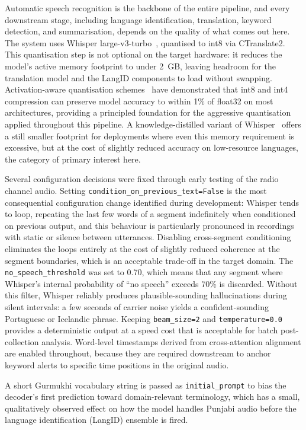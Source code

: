 \documentclass[conference]{IEEEtran}
\begin{document}
Automatic speech recognition is the backbone of the entire pipeline, and every downstream stage, including language identification, translation, keyword detection, and summarisation, depends on the quality of what comes out here. The system uses Whisper large-v3-turbo~\cite{radford2022whisper}, quantised to int8 via CTranslate2. This quantisation step is not optional on the target hardware: it reduces the model's active memory footprint to under 2~GB, leaving headroom for the translation model and the LangID components to load without swapping. Activation-aware quantisation schemes~\cite{lin2024awq} have demonstrated that int8 and int4 compression can preserve model accuracy to within 1\% of float32 on most architectures, providing a principled foundation for the aggressive quantisation applied throughout this pipeline. A knowledge-distilled variant of Whisper~\cite{gandhi2023distilwhisper} offers a still smaller footprint for deployments where even this memory requirement is excessive, but at the cost of slightly reduced accuracy on low-resource languages, the category of primary interest here.

Several configuration decisions were fixed through early testing of the radio channel audio. Setting \texttt{condition\_on\_previous\_text=False} is the most consequential configuration change identified during development: Whisper tends to loop, repeating the last few words of a segment indefinitely when conditioned on previous output, and this behaviour is particularly pronounced in recordings with static or silence between utterances. Disabling cross-segment conditioning eliminates the loops entirely at the cost of slightly reduced coherence at the segment boundaries, which is an acceptable trade-off in the target domain. The \texttt{no\_speech\_threshold} was set to 0.70, which means that any segment where Whisper's internal probability of ``no speech'' exceeds 70\% is discarded. Without this filter, Whisper reliably produces plausible-sounding hallucinations during silent intervals: a few seconds of carrier noise yields a confident-sounding Portuguese or Icelandic phrase. Keeping \texttt{beam\_size=2} and \texttt{temperature=0.0} provides a deterministic output at a speed cost that is acceptable for batch post-collection analysis. Word-level timestamps derived from cross-attention alignment are enabled throughout, because they are required downstream to anchor keyword alerts to specific time positions in the original audio.

A short Gurmukhi vocabulary string is passed as \texttt{initial\_prompt} to bias the decoder's first prediction toward domain-relevant terminology, which has a small, qualitatively observed effect on how the model handles Punjabi audio before the language identification (LangID) ensemble is fired.
\end{document}
